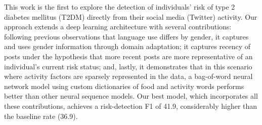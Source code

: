 This work is the first to explore the detection of individuals' risk of type 2 diabetes mellitus (T2DM) directly from their social media (Twitter) activity. Our approach extends a deep learning architecture with several contributions: following previous observations that language use differs by gender, it captures and uses gender information through domain adaptation; it captures recency of posts under the hypothesis that more recent posts are more representative of an individual's current risk status; and, lastly, it demonstrates that in this scenario where activity factors are sparsely represented in the data, a bag-of-word neural network model using custom dictionaries of food and activity words performs better than other neural sequence models. Our best model, which incorporates all these contributions, achieves a risk-detection F1 of 41.9, considerably higher than the baseline rate (36.9).
